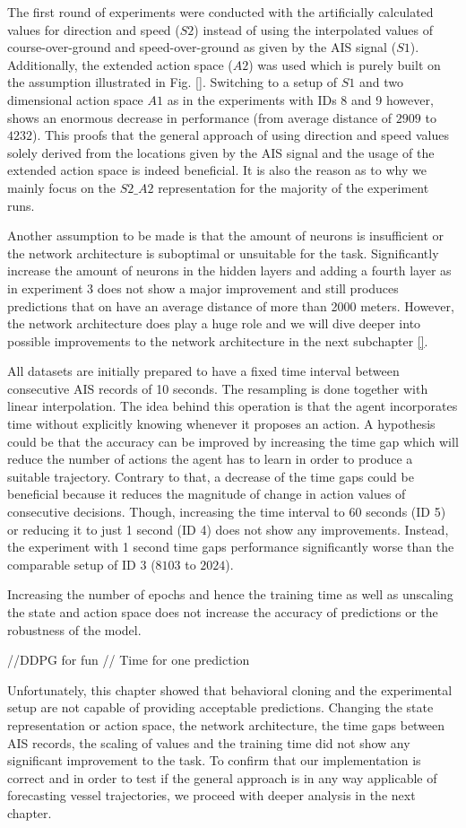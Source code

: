The first round of experiments were conducted with the artificially calculated values for direction and speed ($S2$) instead of using the interpolated values of course-over-ground and speed-over-ground as given by the AIS signal ($S1$). Additionally, the extended action space ($A2$) was used which is purely built on the assumption illustrated in Fig. \ref{}. Switching to a setup of $S1$ and two dimensional action space $A1$ as in the experiments with IDs 8 and 9 however, shows an enormous decrease in performance (from average distance of $2909$ to $4232$). This proofs that the general approach of using direction and speed values solely derived from the locations given by the AIS signal and the usage of the extended action space is indeed beneficial. It is also the reason as to why we mainly focus on the $S2\_A2$ representation for the majority of the experiment runs.
\par
Another assumption to be made is that the amount of neurons is insufficient or the network architecture is suboptimal or unsuitable for the task. Significantly increase the amount of neurons in the hidden layers and adding a fourth layer as in experiment 3 does not show a major improvement and still produces predictions that on have an average distance of more than 2000 meters. However, the network architecture does play a huge role and we will dive deeper into possible improvements to the network architecture in the next subchapter \ref{}.
\par
All datasets are initially prepared to have a fixed time interval between consecutive AIS records of 10 seconds. The resampling is done together with linear interpolation. The idea behind this operation is that the agent incorporates time without explicitly knowing whenever it proposes an action. A hypothesis could be that the accuracy can be improved by increasing the time gap which will reduce the number of actions the agent has to learn in order to produce a suitable trajectory. Contrary to that, a decrease of the time gaps could be beneficial because it reduces the magnitude of change in action values of consecutive decisions. Though, increasing the time interval to 60 seconds (ID 5) or reducing it to just 1 second (ID 4) does not show any improvements. Instead, the experiment with 1 second time gaps performance significantly worse than the comparable setup of ID 3 ($8103$ to $2024$).
\par
Increasing the number of epochs and hence the training time as well as unscaling the state and action space does not increase the accuracy of predictions or the robustness of the model.



//DDPG for fun
// Time for one prediction


Unfortunately, this chapter showed that behavioral cloning and the experimental setup are not capable of providing acceptable predictions.
Changing the state representation or action space, the network architecture, the time gaps between AIS records, the scaling of values and the training time did not show any significant improvement to the task. To confirm that our implementation is correct and in order to test if the general approach is in any way applicable of forecasting vessel trajectories, we proceed with deeper analysis in the next chapter. 